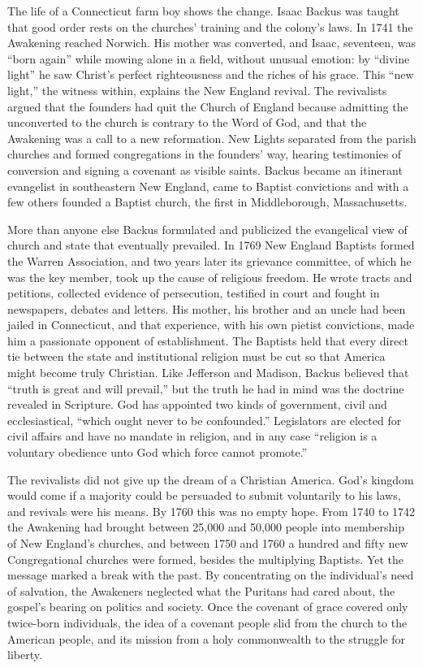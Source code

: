 The life of a Connecticut farm boy shows the change. Isaac Backus was taught that good order rests on
the churches' training and the colony's laws. In 1741 the Awakening reached Norwich. His mother was
converted, and Isaac, seventeen, was ``born again'' while mowing alone in a field, without unusual
emotion: by ``divine light'' he saw Christ's perfect righteousness and the riches of his grace. This
``new light,'' the witness within, explains the New England revival. The revivalists argued that the founders had quit the Church of England because admitting the unconverted to the church is
contrary to the Word of God, and that the Awakening was a call to a new reformation. New Lights
separated from the parish churches and formed congregations in the founders' way, hearing testimonies
of conversion and signing a covenant as visible saints. Backus became an itinerant evangelist in
southeastern New England, came to Baptist convictions and with a few others founded a Baptist church, the first in Middleborough, Massachusetts.

More than anyone else Backus formulated and publicized the evangelical view of church and state that
eventually prevailed. In 1769 New England Baptists formed the Warren Association, and two years later
its grievance committee, of which he was the key member, took up the cause of religious freedom. He
wrote tracts and petitions, collected evidence of persecution, testified in court and fought in
newspapers, debates and letters. His mother, his brother and an uncle had been jailed in Connecticut, and that experience, with his own pietist convictions, made him a passionate opponent of establishment. The Baptists held that
every direct tie between the state and institutional religion must be cut so that America might
become truly Christian. Like Jefferson and Madison, Backus believed that ``truth is great and will
prevail,'' but the truth he had in mind was the doctrine revealed in Scripture. God has appointed two kinds of
government, civil and ecclesiastical, ``which ought never to be confounded.'' Legislators are elected
for civil affairs and have no mandate in religion, and in any case ``religion is a voluntary
obedience unto God which force cannot promote.''

The revivalists did not give up the dream of a Christian America. God's kingdom would come if a
majority could be persuaded to submit voluntarily to his laws, and revivals were his means. By 1760
this was no empty hope. From 1740 to 1742 the Awakening had brought between 25,000 and 50,000 people into membership of New England's churches, and between 1750 and 1760 a hundred and fifty new Congregational churches were
formed, besides the multiplying Baptists. Yet the message marked a break with the past. By
concentrating on the individual's need of salvation, the Awakeners neglected what the Puritans had cared about, the gospel's bearing on politics and society. Once the covenant of grace covered only twice-born individuals, the idea of a covenant people slid from the church to the American people, and its
mission from a holy commonwealth to the struggle for liberty.

